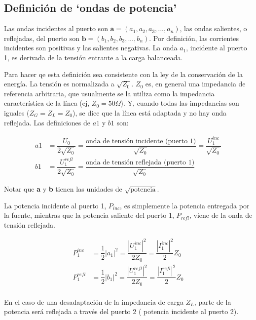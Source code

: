 \subsection{Definición de \enquote*{ondas de potencia}}

Las ondas incidentes al puerto son $\textbf{a}=(a_1, a_2, a_3, ..., a_n)$, las ondas salientes, o reflejadas, del puerto son  
$\textbf{b}=(b_1, b_2, b_3, ..., b_n)$. Por definición, las corrientes incidentes son positivas y las salientes negativas. La
onda $a_1$, incidente al puerto 1, es derivada de la tensión entrante a la carga balanceada. 

Para hacer qe esta definición sea consistente con la ley de la conservación de la energía. La tensión es normalizada a $\sqrt{Z_0}$. 
$Z_0$ es, en general una impedancia de referencia arbitraria, que usualmente se la utiliza como la impedancia característica de la 
línea (ej, $Z_0 = 50 \Omega$). Y, cuando todas las impedancias son iguales ($Z_G = Z_L = Z_0$), se dice que la línea está adaptada
y no hay onda reflejada. Las definiciones de $a1$ y $b1$ son:

\begin{equation}
\begin{aligned}
	a1 &= \dfrac{U_0}{2\sqrt{Z_0}}= \dfrac{\textrm{onda de tensión incidente (puerto 1)}}{\sqrt{Z_0}}=\dfrac{U_1^{inc}}{\sqrt{Z_0}} \\
	b1 &= \dfrac{U_1^{refl}}{2\sqrt{Z_0}}= \dfrac{\textrm{onda de tensión reflejada (puerto 1)}}{\sqrt{Z_0}}
\end{aligned}
\end{equation}

Notar que \textbf{a} y \textbf{b} tienen las unidades de $\sqrt{\textrm{potencia}}$.

La potencia incidente al puerto 1, $P_{inc}$, es simplemente la potencia entregada por la fuente, mientras que la potencia saliente 
del puerto 1, $P_{refl}$, viene de la onda de tensión reflejada.

\begin{equation}
\begin{aligned}
	P_1^{inc} &= \dfrac{1}{2}|a_1|^2= \dfrac{|U_1^{inc}|^2}{2Z_0}=\dfrac{|I_1^{inc}|^2}{2}Z_0 \\
	P_1^{refl} &= \dfrac{1}{2}|b_1|^2= \dfrac{|U_1^{refl}|^2}{2Z_0}=\dfrac{|I_1^{refl}|^2}{2}Z_0 \\
\end{aligned}
\end{equation}

En el caso de una desadaptación de la impedancia de carga $Z_L$, parte de la potencia será reflejada a través del puerto 2 (
potencia incidente al puerto 2).

